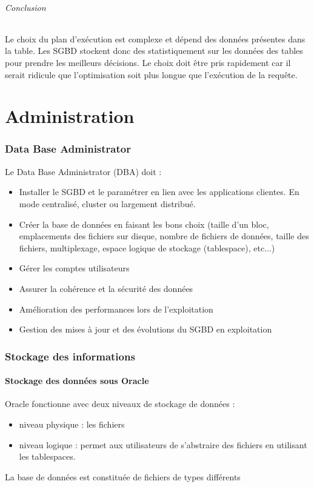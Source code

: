 \documentclass[10pt,a4paper,twoside]{article}
\begin{document}
\paragraph{Conclusion} Le choix du plan d'exécution est complexe et dépend des données présentes dans la table. Les SGBD stockent donc des statistiquement sur les données des tables pour prendre les meilleurs décisions. Le choix doit être pris rapidement car il serait ridicule que l'optimisation soit plus longue que l'exécution de la requête.

\newpage
\part{Administration}
\section{Data Base Administrator}
Le Data Base Administrator (DBA) doit :
\begin{itemize}
\item Installer le SGBD et le paramétrer en lien avec les applications clientes. En mode centralisé, cluster ou largement distribué.
\item Créer la base de données en faisant les bons choix (taille d'un bloc, emplacements des fichiers sur disque, nombre de fichiers de données, taille des fichiers, multiplexage, espace logique de stockage (tablespace), etc...)
\item Gérer les comptes utilisateurs
\item Assurer la cohérence et la sécurité des données
\item Amélioration des performances lors de l'exploitation
\item Gestion des mises à jour et des évolutions du SGBD en exploitation
\end{itemize}

\section{Stockage des informations}
\subsection{Stockage des données sous Oracle}
Oracle fonctionne avec deux niveaux de stockage de données :
\begin{itemize}
\item niveau physique : les fichiers
\item niveau logique : permet aux utilisateurs de s'abstraire des fichiers en utilisant les tablespaces.
\end{itemize}
La base de données est constituée de fichiers de types différents
\end{document}
